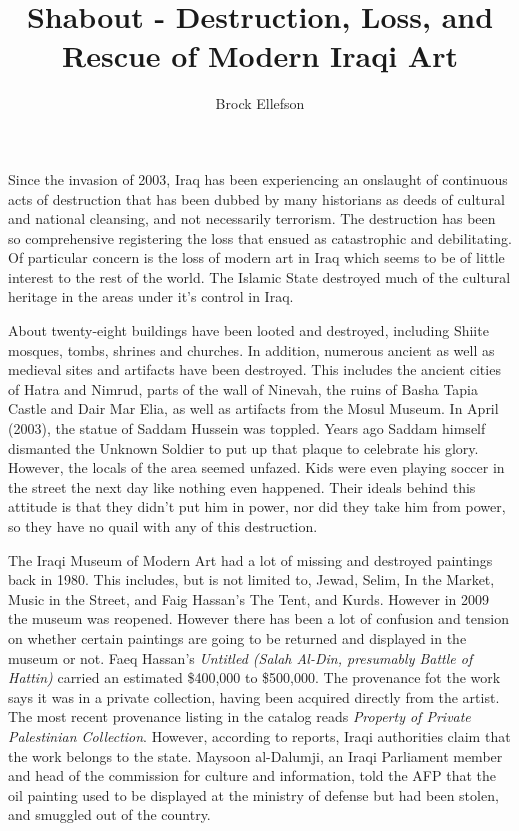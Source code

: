 \documentclass[12pt,letterpaper]{article}
\author{Brock Ellefson}
\title{Shabout - Destruction, Loss, and Rescue of Modern Iraqi Art }
\begin{document}
\maketitle
\doublespace
Since the invasion of 2003, Iraq has been experiencing an onslaught of continuous acts of destruction that has been dubbed by many historians as deeds of cultural and national cleansing, and not necessarily terrorism. The destruction has been so comprehensive registering the loss that ensued as catastrophic and debilitating. Of particular concern is the loss of modern art in Iraq which seems to be of little interest to the rest of the world. The Islamic State destroyed much of the cultural heritage in the areas under it's control in Iraq. 

About twenty-eight buildings have been looted and destroyed, including Shiite mosques, tombs, shrines and churches. In addition, numerous ancient as well as medieval sites and artifacts have been destroyed. This includes the ancient cities of Hatra and Nimrud, parts of the wall of Ninevah, the ruins of Basha Tapia Castle and Dair Mar Elia, as well as artifacts from the Mosul Museum. In April (2003), the statue of Saddam Hussein was toppled. Years ago Saddam himself dismanted the Unknown Soldier to put up that plaque to celebrate his glory. However, the locals of the area seemed unfazed. Kids were even playing soccer in the street the next day like nothing even happened. Their ideals behind this attitude is that they didn't put him in power, nor did they take him from power, so they have no quail with any of this destruction. 

The Iraqi Museum of Modern Art had a lot of missing and destroyed paintings back in 1980. This includes, but is not limited to, Jewad, Selim, In the Market, Music in the Street, and Faig Hassan's The Tent, and Kurds. However in 2009 the museum was reopened. However there has been a lot of confusion and tension on whether certain paintings are going to be returned and displayed in the museum or not. Faeq Hassan's \textit{Untitled (Salah Al-Din, presumably Battle of Hattin)} carried an estimated \$400,000 to \$500,000. The provenance fot the work says it was in a private collection, having been acquired directly from the artist. The most recent provenance listing in the catalog reads \textit{Property of Private Palestinian Collection}. However, according to reports, Iraqi authorities claim that the work belongs to the state. Maysoon al-Dalumji, an Iraqi Parliament member and head of the commission for culture and information, told the AFP that the oil painting used to be displayed at the ministry of defense but had been stolen, and smuggled out of the country.
\end{document}
